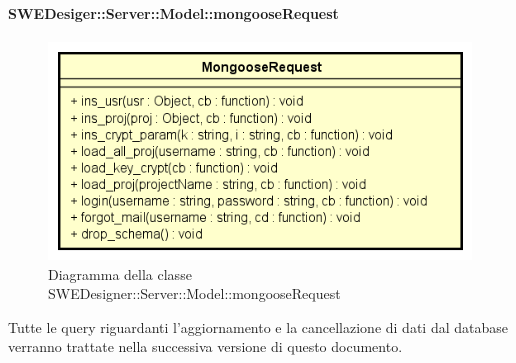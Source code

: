       \paragraph{SWEDesiger::Server::Model::mongooseRequest}
      	\begin{figure}[h!]
		\centering
		\includegraphics[scale=0.8]{Classi/MongooseRequest.png}
		\caption{Diagramma della classe SWEDesigner::Server::Model::mongooseRequest}
 		\end{figure}
        Tutte le query riguardanti l'aggiornamento e la cancellazione di dati dal database verranno trattate nella successiva versione di questo documento.
